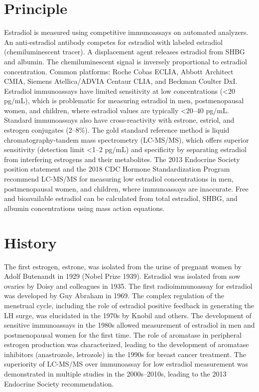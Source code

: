 \section*{Principle}
Estradiol is measured using competitive immunoassays on automated analyzers. An anti-estradiol antibody competes for estradiol with labeled estradiol (chemiluminescent tracer). A displacement agent releases estradiol from SHBG and albumin. The chemiluminescent signal is inversely proportional to estradiol concentration. Common platforms: Roche Cobas ECLIA, Abbott Architect CMIA, Siemens Atellica/ADVIA Centaur CLIA, and Beckman Coulter DxI. Estradiol immunoassays have limited sensitivity at low concentrations (<20 pg/mL), which is problematic for measuring estradiol in men, postmenopausal women, and children, where estradiol values are typically <20--40 pg/mL. Standard immunoassays also have cross-reactivity with estrone, estriol, and estrogen conjugates (2--8\%). The gold standard reference method is liquid chromatography-tandem mass spectrometry (LC-MS/MS), which offers superior sensitivity (detection limit <1--2 pg/mL) and specificity by separating estradiol from interfering estrogens and their metabolites. The 2013 Endocrine Society position statement and the 2018 CDC Hormone Standardization Program recommend LC-MS/MS for measuring low estradiol concentrations in men, postmenopausal women, and children, where immunoassays are inaccurate. Free and bioavailable estradiol can be calculated from total estradiol, SHBG, and albumin concentrations using mass action equations.

\section*{History}
The first estrogen, estrone, was isolated from the urine of pregnant women by Adolf Butenandt in 1929 (Nobel Prize 1939). Estradiol was isolated from sow ovaries by Doisy and colleagues in 1935. The first radioimmunoassay for estradiol was developed by Guy Abraham in 1969. The complex regulation of the menstrual cycle, including the role of estradiol positive feedback in generating the LH surge, was elucidated in the 1970s by Knobil and others. The development of sensitive immunoassays in the 1980s allowed measurement of estradiol in men and postmenopausal women for the first time. The role of aromatase in peripheral estrogen production was characterized, leading to the development of aromatase inhibitors (anastrozole, letrozole) in the 1990s for breast cancer treatment. The superiority of LC-MS/MS over immunoassay for low estradiol measurement was demonstrated in multiple studies in the 2000s--2010s, leading to the 2013 Endocrine Society recommendation.

